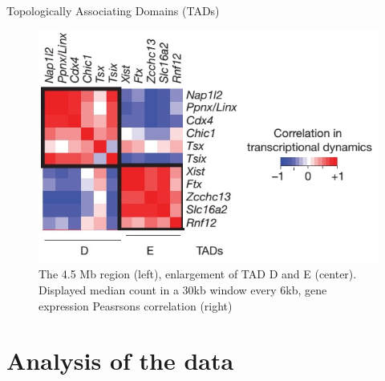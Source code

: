 \documentclass[8pt]{beamer}
\begin{document}
\begin{frame}{Topologically Associating Domains (TADs)}
\begin{figure}[H]
\quad
\includegraphics[scale=0.27]{transcriptionCorrelationTadDandENoraEtAl2012}
\caption{\tiny{The 4.5 Mb region (left), enlargement of TAD D and E (center). Displayed median count in a 30kb window every 6kb, gene expression Peasrsons correlation (right)}}
\label{fig:TADsOfTheXChromosome_NoraEtAl2012}
\end{figure}
\end{frame}

\section{Analysis of the data}\label{section_analysisOfTheData}
\end{document}
